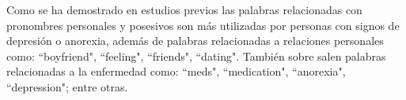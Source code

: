 Como se ha demostrado en estudios previos las palabras relacionadas con pronombres personales y posesivos son más utilizadas por personas con signos de depresión o anorexia, además de palabras relacionadas a relaciones personales como: ``boyfriend", ``feeling", ``friends", ``dating". También sobre salen palabras relacionadas a la enfermedad como: ``meds", ``medication", ``anorexia", ``depression"; entre otras.







